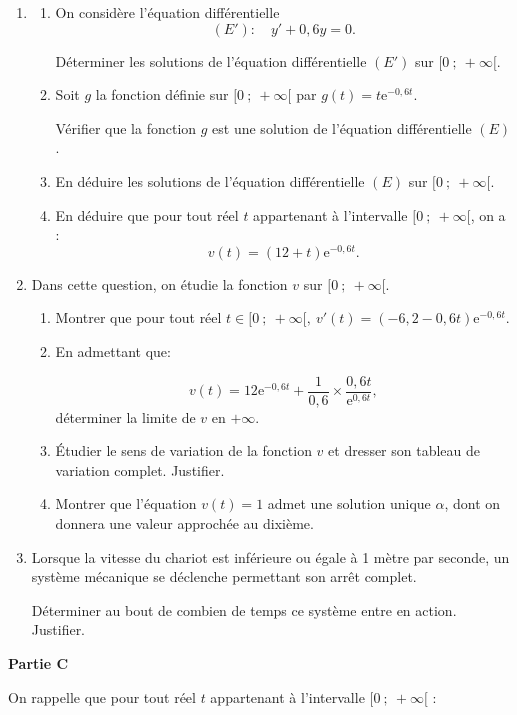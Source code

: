 \documentclass[10pt]{article}
\providecommand{\e}{{\mathrm{e}}}
\begin{document}
\begin{enumerate}
\item 
	\begin{enumerate}
		\item On considère l'équation différentielle 
		\[(E') :\quad y' + 0,6y = 0.\]
		
Déterminer les solutions de l'équation différentielle $(E')$ sur $[0~;~+\infty[$.
		\item Soit $g$ la fonction définie sur $[0~;~+\infty[$ par $g(t) = t\e^{-0,6t}$.
		
Vérifier que la fonction $g$ est une solution de l'équation différentielle $(E)$.
		\item En déduire les solutions de l'équation différentielle $(E)$ sur $[0~;~+\infty[$.
		\item En déduire que pour tout réel $t$ appartenant à l'intervalle $[0~;~+\infty[$, on a :
\[v(t) = (12+t)\e^{-0,6t}.\]
	\end{enumerate}
\item Dans cette question, on étudie la fonction $v$ sur $[0~;~+\infty[$.
	\begin{enumerate}
		\item Montrer que pour tout réel $t \in [0~;~ +\infty[,\: v'(t) = (-6,2 - 0,6t)\e^{-0,6t}$.
		\item En admettant que:
		
\[v(t) = 12\e^{-0,6t} + \dfrac{1}{0,6} \times  \dfrac{0,6t}{\e^{0,6t}},\]
déterminer la limite de $v$ en $+\infty$.
		\item Étudier le sens de variation de la fonction $v$ et dresser son tableau de
variation complet. Justifier.
		\item Montrer que l'équation $v(t) = 1$ admet une solution unique $\alpha$, dont on
donnera une valeur approchée au dixième.
	\end{enumerate}
\item Lorsque la vitesse du chariot est inférieure ou égale à 1 mètre par seconde, un système mécanique se déclenche permettant son arrêt complet.

Déterminer au bout de combien de temps ce système entre en action. Justifier.
\end{enumerate}

\begin{center}\textbf{Partie C} \end{center}

On rappelle que pour tout réel $t$ appartenant à l'intervalle $[0~;~ +\infty[$ :
\end{document}
